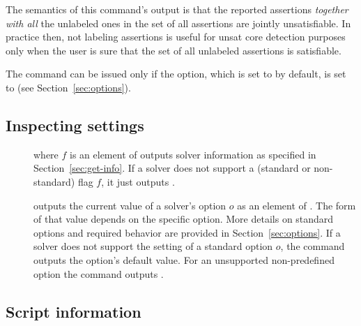 \begin{description}
The semantics of this command's output is that the reported assertions
\emph{together with all} the unlabeled ones in the set of all
assertions are jointly unsatisfiable.  In practice then, not labeling
assertions is useful for unsat core detection purposes only when the
user is sure that the set of all unlabeled assertions is satisfiable.

The command can be issued only if the  option,
which is set to  by default, is set to  
(see Section~\ref{sec:options}).

\end{description}


\subsection{Inspecting settings}

\begin{description}

%
\item[] where $f$ is an element of 
outputs solver information as specified in Section~\ref{sec:get-info}.
If a solver does not support a (standard or non-standard) flag $f$,
it just outputs . 
\smallskip

%
\item[] 
outputs the current value of a solver's option $o$
as an element of .
The form of that value depends on the specific option.
More details on standard options and required behavior are provided 
in Section~\ref{sec:options}.  
If a solver does not support the setting of a standard option $o$,
the command outputs the option's default value.
For an unsupported non-predefined option the command outputs .  
\end{description}


\subsection{Script information} \label{sec:script-info}

